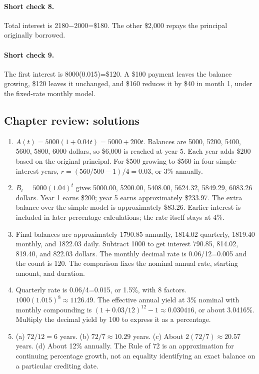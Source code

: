 \documentclass[11pt,letterpaper]{article}
\begin{document}
{\paragraph{Short check 8.}
Total interest is 2180$-$2000=\$180. The other \$2,000 repays the principal originally borrowed.


\paragraph{Short check 9.}
The first interest is 8000(0.015)=\$120. A \$100 payment leaves the balance growing, \$120 leaves it unchanged, and \$160 reduces it by \$40 in month 1, under the fixed-rate monthly model.


\clearpage

\subsection*{Chapter review: solutions}
\begin{enumerate}
\item $A(t)=5000(1+0.04t)=5000+200t$. Balances are 5000, 5200, 5400, 5600, 5800, 6000 dollars, so \$6,000 is reached at year 5. Each year adds \$200 based on the original principal. For \$500 growing to \$560 in four simple-interest years, $r=(560/500-1)/4=0.03$, or 3\% annually.
\item $B_t=5000(1.04)^t$ gives 5000.00, 5200.00, 5408.00, 5624.32, 5849.29, 6083.26 dollars. Year 1 earns \$200; year 5 earns approximately \$233.97. The extra balance over the simple model is approximately \$83.26. Earlier interest is included in later percentage calculations; the rate itself stays at 4\%.
\item Final balances are approximately 1790.85 annually, 1814.02 quarterly, 1819.40 monthly, and 1822.03 daily. Subtract 1000 to get interest 790.85, 814.02, 819.40, and 822.03 dollars. The monthly decimal rate is 0.06/12=0.005 and the count is 120. The comparison fixes the nominal annual rate, starting amount, and duration.
\item Quarterly rate is 0.06/4=0.015, or 1.5\%, with 8 factors. $1000(1.015)^8\approx1126.49$. The effective annual yield at 3\% nominal with monthly compounding is $(1+0.03/12)^{12}-1\approx0.030416$, or about 3.0416\%. Multiply the decimal yield by 100 to express it as a percentage.
\item (a) $72/12=6$ years. (b) $72/7\approx10.29$ years. (c) About $2(72/7)\approx20.57$ years. (d) About 12\% annually. The Rule of 72 is an approximation for continuing percentage growth, not an equality identifying an exact balance on a particular crediting date.

\end{enumerate}}
\end{document}
